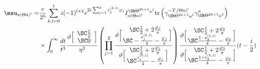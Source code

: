 \begin{equation}
\begin{aligned}
\msu_{a(\Theta a)'}=  & \frac{c}{2^5}\sum_{k,l=0}^1 
 i (-1)^{l+1} e^{2 i\sum_{j=1}^3 \epsilon^{(k,l)}_j \varphi_j}I^{\OR\Theta^{2k+1}\omega^l}_{a(\Theta a)'} 
\text{tr}\left(\gamma_{\OR\Theta^{2k+1}\omega^l}^{-T,(\Theta a)'}\gamma_{\OR\Theta^{2k+1}\omega^l}^{a}\right)  \\
& \times \int_0^{\infty}\frac{dt}{t^3}
\frac{\vartheta \Bigl[ \begin{array}{c} \SC \frac{1}{2} \\ \SC 0 \end{array} \Bigr]}{\eta^3}
\left(\prod_{j=1}^2 
\frac{\vartheta \Bigl[\!\! \begin{array}{c}  \SC \frac{1}{2}+2\frac{\varphi_j}{\pi} \\ \SC -\frac{\epsilon^{(k,l)}_j}{4}-\frac{\varphi_j}{\pi}   
\end{array} \!\!\Bigr]}
  {\vartheta \Bigl[\!\! \begin{array}{c}  \SC \frac{1}{2}+2\frac{\varphi_j}{\pi} \\  \SC \frac{\epsilon^{(k,l)}_j}{4}-\frac{\varphi_j}{\pi}
 \end{array} \!\!\Bigr]}
\right)
\frac{\vartheta \Bigl[\!\! \begin{array}{c}  \SC \frac{1}{2}+2\frac{\varphi_3}{\pi} \\ \SC \frac{1-\epsilon^{(k,l)}_3}{4}-\frac{\varphi_3}{\pi}  
\end{array} \!\!\Bigr]}
  {\vartheta \Bigl[\!\! \begin{array}{c}  \SC \frac{1}{2}+2\frac{\varphi_3}{\pi} \\  \SC \frac{1+\epsilon^{(k,l)}_3}{4}-\frac{\varphi_3}{\pi}
 \end{array} \!\!\Bigr]}
(t-\frac{i}{2})
\end{aligned} \nonumber
\end{equation}

